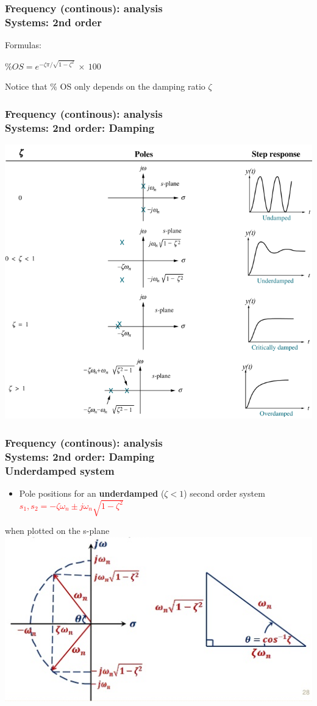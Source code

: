\documentclass[hyperref={pdfpagelabels=true}]{beamer}
\begin{document}
\begin{frame}
\frametitle{Frequency (continous): analysis \\ {\large Systems: 2nd order}}
Formulas:
 \begin{tcolorbox}[title=  ,width=9.85 cm]
\huge{
$\% OS = e^{-\zeta \pi/\sqrt{1-\zeta^2}}\ \times \ 100$
}
\end{tcolorbox}
Notice that $\%$ OS only depends on the damping ratio $\zeta$
\end{frame}

\begin{frame}
\frametitle{Frequency (continous): analysis \\ {\large Systems: 2nd order: Damping}}
\includegraphics[scale = 0.32]{figs/Selection_028.png}
\end{frame}

\begin{frame}
\frametitle{Frequency (continous): analysis \\ {\large Systems: 2nd order: Damping} \\ {\small Underdamped system}}
\begin{itemize}
\item Pole positions for an {\bf underdamped} ($\zeta < 1$) second order system
\textcolor{red}{$s_1,s_2=-\zeta\omega_n\pm j\omega_n \sqrt{1-\zeta^2}$}
\end{itemize}
when plotted on the s-plane
\includegraphics[scale = 0.52]{figs/Selection_029.png}
\end{frame}
\end{document}
